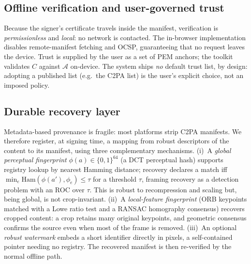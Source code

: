 \documentclass[11pt]{article}
\begin{document}
\subsection{Offline verification and user-governed trust}
Because the signer's certificate travels inside the manifest, verification is
\emph{permissionless} and \emph{local}: no network is contacted. The in-browser implementation
disables remote-manifest fetching and OCSP, guaranteeing that no request leaves the device.
Trust is supplied by the user as a set of PEM anchors; the toolkit validates $C$ against
$\mathcal{A}$ on-device. The system ships \emph{no} default trust list, by design: adopting
a published list (e.g.\ the C2PA list) is the user's explicit choice, not an imposed policy.

\subsection{Durable recovery layer}
Metadata-based provenance is fragile: most platforms strip C2PA manifests. We therefore
register, at signing time, a mapping from robust descriptors of the content to its manifest,
using three complementary mechanisms. (i)~A \emph{global perceptual fingerprint}
$\phi(a)\in\{0,1\}^{64}$ (a DCT perceptual hash) supports registry lookup by nearest Hamming
distance; recovery declares a match iff $\min_e \mathrm{Ham}(\phi(a'), \phi_e) \le \tau$ for a
threshold $\tau$, framing recovery as a detection problem with an ROC over $\tau$. This is
robust to recompression and scaling but, being global, is not crop-invariant. (ii)~A
\emph{local-feature fingerprint} (ORB keypoints matched with a Lowe ratio test and a RANSAC
homography consensus) recovers cropped content: a crop retains many original keypoints, and
geometric consensus confirms the source even when most of the frame is removed. (iii)~An
optional \emph{robust watermark} embeds a short identifier directly in pixels, a
self-contained pointer needing no registry. The recovered manifest is then re-verified by the
normal offline path.
\end{document}
